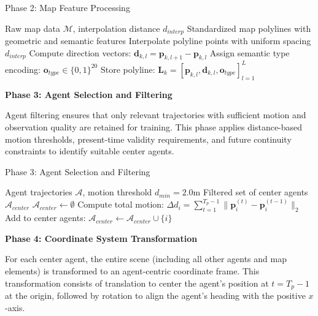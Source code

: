 \begin{algorithm}[H]
\caption{Phase 2: Map Feature Processing}
\label{alg:phase2_map}
\begin{algorithmic}[1]
\REQUIRE Raw map data \(\mathcal{M}\), interpolation distance \(d_{interp}\)
\ENSURE Standardized map polylines with geometric and semantic features
    \STATE Interpolate polyline points with uniform spacing \(d_{interp}\)
    \STATE Compute direction vectors: \(\boldsymbol{d}_{k,l} = \boldsymbol{p}_{k,l+1} - \boldsymbol{p}_{k,l}\)
    \STATE Assign semantic type encoding: \(\boldsymbol{o}_{type} \in \{0,1\}^{20}\)
    \STATE Store polyline: \(\boldsymbol{L}_k = [\boldsymbol{p}_{k,l}, \boldsymbol{d}_{k,l}, \boldsymbol{o}_{type}]_{l=1}^{L}\)
\ENDFOR
\end{algorithmic}
\end{algorithm}

\textbf{Phase 3: Agent Selection and Filtering}

Agent filtering ensures that only relevant trajectories with sufficient motion and observation quality are retained for training. This phase applies distance-based motion thresholds, present-time validity requirements, and future continuity constraints to identify suitable center agents.

\begin{algorithm}[H]
\caption{Phase 3: Agent Selection and Filtering}
\label{alg:phase3_filtering}
\begin{algorithmic}[1]
\REQUIRE Agent trajectories \(\mathcal{A}\), motion threshold \(d_{min} = 2.0\)m
\ENSURE Filtered set of center agents \(\mathcal{A}_{center}\)
\STATE \(\mathcal{A}_{center} \leftarrow \emptyset\)
    \STATE Compute total motion: \(\Delta d_i = \sum_{t=1}^{T_p-1} \|\boldsymbol{p}_i^{(t)} - \boldsymbol{p}_i^{(t-1)}\|_2\)
        \STATE Add to center agents: \(\mathcal{A}_{center} \leftarrow \mathcal{A}_{center} \cup \{i\}\)
    \ENDIF
\ENDFOR
\end{algorithmic}
\end{algorithm}

\textbf{Phase 4: Coordinate System Transformation}

For each center agent, the entire scene (including all other agents and map elements) is transformed to an agent-centric coordinate frame. This transformation consists of translation to center the agent's position at \(t = T_p - 1\) at the origin, followed by rotation to align the agent's heading with the positive \(x\)-axis.

